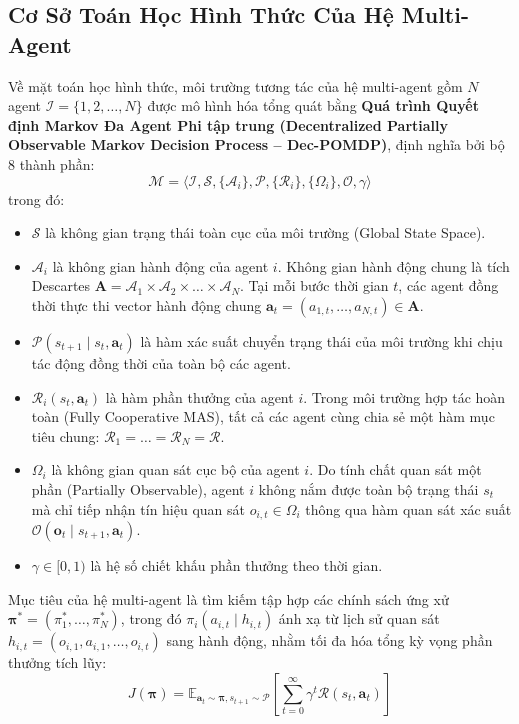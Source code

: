 \documentclass[12pt,a4paper]{report}
\begin{document}
\subsection{Cơ Sở Toán Học Hình Thức Của Hệ Multi-Agent}
Về mặt toán học hình thức, môi trường tương tác của hệ multi-agent gồm $N$ agent $\mathcal{I} = \{1, 2, \dots, N\}$ được mô hình hóa tổng quát bằng \textbf{Quá trình Quyết định Markov Đa Agent Phi tập trung (Decentralized Partially Observable Markov Decision Process -- Dec-POMDP)}, định nghĩa bởi bộ 8 thành phần:
\begin{equation}
    \mathcal{M} = \langle \mathcal{I}, \mathcal{S}, \{\mathcal{A}_i\}, \mathcal{P}, \{\mathcal{R}_i\}, \{\Omega_i\}, \mathcal{O}, \gamma \rangle
\end{equation}
trong đó:
\begin{itemize}[leftmargin=1.2cm]
    \item $\mathcal{S}$ là không gian trạng thái toàn cục của môi trường (Global State Space).
    \item $\mathcal{A}_i$ là không gian hành động của agent $i$. Không gian hành động chung là tích Descartes $\mathbf{A} = \mathcal{A}_1 \times \mathcal{A}_2 \times \dots \times \mathcal{A}_N$. Tại mỗi bước thời gian $t$, các agent đồng thời thực thi vector hành động chung $\mathbf{a}_t = (a_{1,t}, \dots, a_{N,t}) \in \mathbf{A}$.
    \item $\mathcal{P}(s_{t+1} \mid s_t, \mathbf{a}_t)$ là hàm xác suất chuyển trạng thái của môi trường khi chịu tác động đồng thời của toàn bộ các agent.
    \item $\mathcal{R}_i(s_t, \mathbf{a}_t)$ là hàm phần thưởng của agent $i$. Trong môi trường hợp tác hoàn toàn (Fully Cooperative MAS), tất cả các agent cùng chia sẻ một hàm mục tiêu chung: $\mathcal{R}_1 = \dots = \mathcal{R}_N = \mathcal{R}$.
    \item $\Omega_i$ là không gian quan sát cục bộ của agent $i$. Do tính chất quan sát một phần (Partially Observable), agent $i$ không nắm được toàn bộ trạng thái $s_t$ mà chỉ tiếp nhận tín hiệu quan sát $o_{i,t} \in \Omega_i$ thông qua hàm quan sát xác suất $\mathcal{O}(\mathbf{o}_t \mid s_{t+1}, \mathbf{a}_t)$.
    \item $\gamma \in [0, 1)$ là hệ số chiết khấu phần thưởng theo thời gian.
\end{itemize}

Mục tiêu của hệ multi-agent là tìm kiếm tập hợp các chính sách ứng xử $\boldsymbol{\pi}^* = (\pi_1^*, \dots, \pi_N^*)$, trong đó $\pi_i(a_{i,t} \mid h_{i,t})$ ánh xạ từ lịch sử quan sát $h_{i,t} = (o_{i,1}, a_{i,1}, \dots, o_{i,t})$ sang hành động, nhằm tối đa hóa tổng kỳ vọng phần thưởng tích lũy:
\begin{equation}
    J(\boldsymbol{\pi}) = \mathbb{E}_{\mathbf{a}_t \sim \boldsymbol{\pi}, s_{t+1} \sim \mathcal{P}} \left[ \sum_{t=0}^{\infty} \gamma^t \mathcal{R}(s_t, \mathbf{a}_t) \right]
\end{equation}
\end{document}
